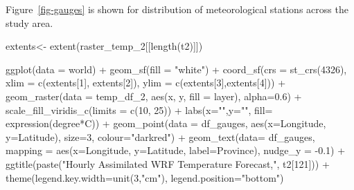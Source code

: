\documentclass[
  letterpaper,
  DIV=11,
  numbers=noendperiod,
  abstract]{scrartcl}
\newenvironment{Shaded}{\begin{snugshade}}{\end{snugshade}}
\newcommand{\AttributeTok}[1]{\textcolor[rgb]{0.40,0.45,0.13}{#1}}
\newcommand{\DecValTok}[1]{\textcolor[rgb]{0.68,0.00,0.00}{#1}}
\newcommand{\FloatTok}[1]{\textcolor[rgb]{0.68,0.00,0.00}{#1}}
\newcommand{\FunctionTok}[1]{\textcolor[rgb]{0.28,0.35,0.67}{#1}}
\newcommand{\NormalTok}[1]{\textcolor[rgb]{0.00,0.23,0.31}{#1}}
\newcommand{\OtherTok}[1]{\textcolor[rgb]{0.00,0.23,0.31}{#1}}
\newcommand{\SpecialCharTok}[1]{\textcolor[rgb]{0.37,0.37,0.37}{#1}}
\newcommand{\StringTok}[1]{\textcolor[rgb]{0.13,0.47,0.30}{#1}}
\begin{document}
Figure~\ref{fig-gauges} is shown for distribution of meteorological
stations across the study area.

\begin{Shaded}
\begin{Highlighting}[]
\NormalTok{extents}\OtherTok{\textless{}{-}} \FunctionTok{extent}\NormalTok{(raster\_temp\_2[[}\FunctionTok{length}\NormalTok{(t2)]])}

\FunctionTok{ggplot}\NormalTok{(}\AttributeTok{data =}\NormalTok{ world)  }\SpecialCharTok{+} \FunctionTok{geom\_sf}\NormalTok{(}\AttributeTok{fill =} \StringTok{"white"}\NormalTok{) }\SpecialCharTok{+} 
  \FunctionTok{coord\_sf}\NormalTok{(}\AttributeTok{crs =} \FunctionTok{st\_crs}\NormalTok{(}\DecValTok{4326}\NormalTok{), }\AttributeTok{xlim =} \FunctionTok{c}\NormalTok{(extents[}\DecValTok{1}\NormalTok{], extents[}\DecValTok{2}\NormalTok{]), }
                               \AttributeTok{ylim =} \FunctionTok{c}\NormalTok{(extents[}\DecValTok{3}\NormalTok{],extents[}\DecValTok{4}\NormalTok{])) }\SpecialCharTok{+}
  \FunctionTok{geom\_raster}\NormalTok{(}\AttributeTok{data =}\NormalTok{ temp\_df\_2, }
        \FunctionTok{aes}\NormalTok{(x, y, }\AttributeTok{fill =}\NormalTok{ layer), }\AttributeTok{alpha=}\FloatTok{0.6}\NormalTok{) }\SpecialCharTok{+}
  \FunctionTok{scale\_fill\_viridis\_c}\NormalTok{(}\AttributeTok{limits =} \FunctionTok{c}\NormalTok{(}\DecValTok{10}\NormalTok{, }\DecValTok{25}\NormalTok{)) }\SpecialCharTok{+} 
  \FunctionTok{labs}\NormalTok{(}\AttributeTok{x=}\StringTok{""}\NormalTok{,}\AttributeTok{y=}\StringTok{""}\NormalTok{, }\AttributeTok{fill=} \FunctionTok{expression}\NormalTok{(degree}\SpecialCharTok{*}\NormalTok{C)) }\SpecialCharTok{+}
  \FunctionTok{geom\_point}\NormalTok{(}\AttributeTok{data =}\NormalTok{ df\_gauges, }\FunctionTok{aes}\NormalTok{(}\AttributeTok{x=}\NormalTok{Longitude, }\AttributeTok{y=}\NormalTok{Latitude),}
             \AttributeTok{size=}\DecValTok{3}\NormalTok{, }\AttributeTok{colour=}\StringTok{"darkred"}\NormalTok{) }\SpecialCharTok{+} 
  \FunctionTok{geom\_text}\NormalTok{(}\AttributeTok{data=}\NormalTok{ df\_gauges, }\AttributeTok{mapping =} \FunctionTok{aes}\NormalTok{(}\AttributeTok{x=}\NormalTok{Longitude, }\AttributeTok{y=}\NormalTok{Latitude, }
                                           \AttributeTok{label=}\NormalTok{Province), }\AttributeTok{nudge\_y =} \SpecialCharTok{{-}}\FloatTok{0.1}\NormalTok{) }\SpecialCharTok{+} 
  \FunctionTok{ggtitle}\NormalTok{(}\FunctionTok{paste}\NormalTok{(}\StringTok{"Hourly Assimilated WRF Temperature Forecast,"}\NormalTok{, t2[}\DecValTok{121}\NormalTok{])) }\SpecialCharTok{+}
  \FunctionTok{theme}\NormalTok{(}\AttributeTok{legend.key.width=}\FunctionTok{unit}\NormalTok{(}\DecValTok{3}\NormalTok{,}\StringTok{"cm"}\NormalTok{), }\AttributeTok{legend.position=}\StringTok{"bottom"}\NormalTok{)}
\end{Highlighting}
\end{Shaded}
\end{document}
